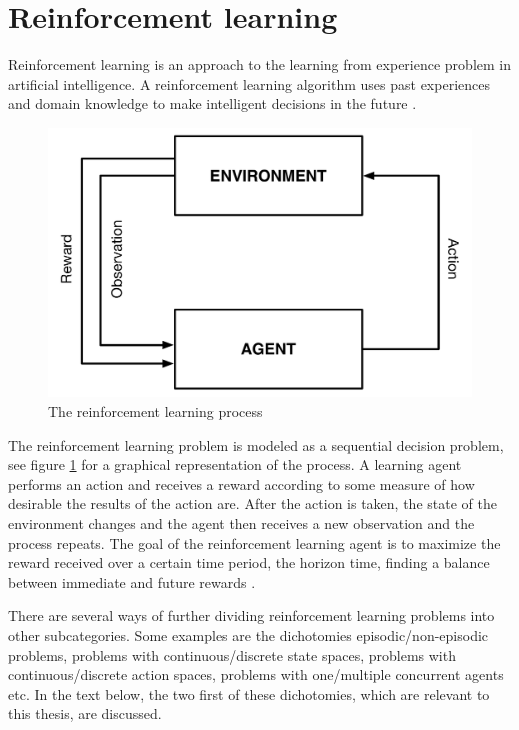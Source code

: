 \section{Reinforcement learning}

Reinforcement learning is an approach to the learning from experience problem in artificial intelligence. A reinforcement learning algorithm uses past experiences and domain knowledge to make intelligent decisions in the future \parencite{barto1998reinforcement}.

\begin{figure}[H]
\includegraphics[width=\textwidth]{images/agent-environment.pdf}
\caption{The reinforcement learning process}
\label{fig:agentandenvironment}
\end{figure}

The reinforcement learning problem is modeled as a sequential decision problem, see figure \ref{fig:agentandenvironment} for a graphical representation of the process. A learning agent performs an action and receives a reward according to some measure of how desirable the results of the action are.  After the action is taken, the state of the environment changes and the agent then receives a new observation and the process repeats. The goal of the reinforcement learning agent is to maximize the reward received over a certain time period, the horizon time, finding a balance between immediate and future rewards \parencite{barto1998reinforcement}. 

There are several ways of further dividing reinforcement learning problems into other subcategories. Some examples are the dichotomies episodic/non-episodic problems, problems with continuous/discrete state spaces, problems with continuous/discrete action spaces, problems with one/multiple concurrent agents etc. In the text below, the two first of these dichotomies, which are relevant to this thesis, are discussed. 

